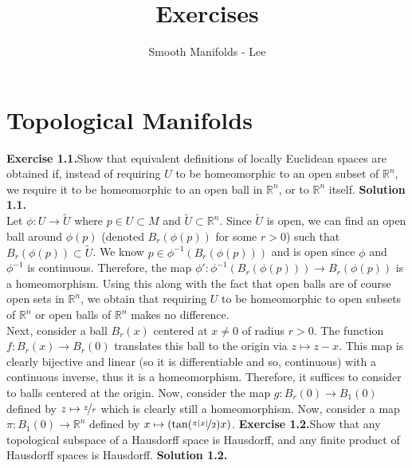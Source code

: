 \documentclass{article}
\title{Exercises}
\author{Smooth Manifolds - Lee}
\begin{document}
   
    \maketitle
    
    \section{Topological Manifolds}

    \textbf{Exercise 1.1.}\qquad Show that equivalent definitions of locally Euclidean spaces are obtained if,
    instead of requiring $U$ to be homeomorphic to an open subset of $\mathbb{R}^n$, we require it to be homeomorphic
    to an open ball in $\mathbb{R}^n$, or to $\mathbb{R}^n$ itself.
    \newline
    \newline
    \textbf{Solution 1.1.}\\

        Let $\phi: U\to\tilde{U}$ where $p\in U\subset M$ and $\tilde{U}\subset\mathbb{R}^n$. Since $\tilde{U}$ is open,
        we can find an open ball around $\phi(p)$ (denoted $B_r(\phi(p))$ for some $r>0$) such that $B_r(\phi(p))\subset\tilde{U}$.
        We know $p\in \phi^{-1}(B_r(\phi(p)))$ and is open since $\phi$ and $\phi^{-1}$ is continuous. Therefore, the map
        $\phi': \phi^{-1}(B_r(\phi(p))) \to B_r(\phi(p))$ is a homeomorphism. Using this along with the fact that open balls
        are of course open sets in $\mathbb{R}^n$, we obtain that requiring $U$ to be homeomorphic to open subsets of $\mathbb{R}^n$
        or open balls of $\mathbb{R}^n$ makes no difference.\\
        \newline
        Next, consider a ball $B_r(x)$ centered at $x\neq 0$ of radius $r>0$. The function $f: B_r(x)\to B_r(0)$ translates this
        ball to the origin via $z\mapsto z-x$. This map is clearly bijective and linear (so it is differentiable and so, continuous)
        with a continuous inverse, thus it is a homeomorphism. Therefore, it suffices to consider to balls centered at the origin.
        Now, consider the map $g: B_r(0) \to B_1(0)$ defined by $z\mapsto \nicefrac{z}{r}$ which is clearly still a homeomorphism.
        Now, consider a map $\pi: B_1(0)\to\mathbb{R}^n$ defined by $x\mapsto (\tan(\nicefrac{\pi|x|}{2})x)$.
    \newline
    \newline
    \textbf{Exercise 1.2.}\qquad Show that any topological subspace of a Hausdorff space is Hausdorff, and any
    finite product of Hausdorff spaces is Hausdorff.
    \newline
    \newline
    \textbf{Solution 1.2.}\\
\end{document}

